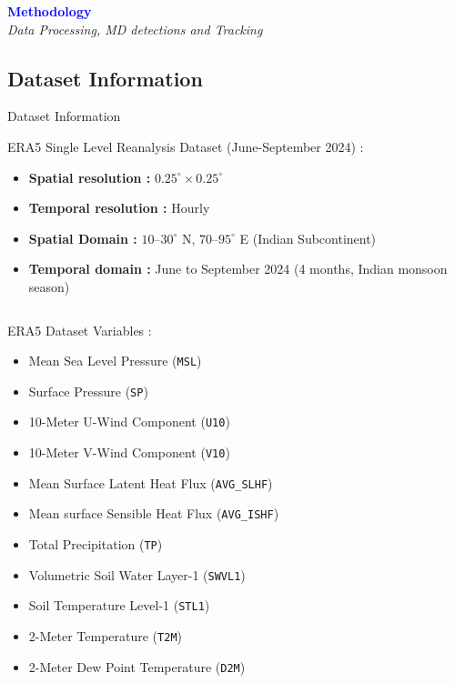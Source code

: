 \begin{frame}
	\begin{center}
		\Huge \textcolor{blue}{\textbf{Methodology}} \\
		\vspace{0.5cm}
		\large \textit{Data Processing, MD detections and Tracking}
	\end{center}
\end{frame}

\subsection{Dataset Information}
\begin{frame}{Dataset Information}
	\vspace{-0.1cm}
	\begin{block}{ERA5 Single Level Reanalysis Dataset (June-September 2024) \tiny \cite{hersbach2020era5} :}
		\footnotesize
		\begin{itemize}
			\item \textbf{Spatial resolution :} \texttt{$0.25^\circ \times 0.25^\circ$}
			\item \textbf{Temporal resolution :} Hourly
			\item \textbf{Spatial Domain :} $10$--$30^\circ$ N, $70$--$95^\circ$ E (Indian Subcontinent)
			\item \textbf{Temporal domain :} June to September 2024 (4 months, Indian monsoon season)
		\end{itemize}
	\end{block}

	\vspace{-0.2cm}
	\begin{columns}[T]
		\begin{block}{ERA5 Dataset Variables :}
			\begin{itemize}\footnotesize
				\item Mean Sea Level Pressure (\texttt{MSL})
				\item Surface Pressure (\texttt{SP})
				\item 10-Meter U-Wind Component (\texttt{U10})
				\item 10-Meter V-Wind Component (\texttt{V10})
				\item Mean Surface Latent Heat Flux (\texttt{AVG\_SLHF})
				\item Mean surface Sensible Heat Flux (\texttt{AVG\_ISHF})
				\item Total Precipitation (\texttt{TP})
				\item Volumetric Soil Water Layer-1 (\texttt{SWVL1})
				\item Soil Temperature Level-1 (\texttt{STL1})
				\item 2-Meter Temperature (\texttt{T2M})
				\item 2-Meter Dew Point Temperature (\texttt{D2M})
			\end{itemize}
		\end{block}


\end{columns}
\end{frame}
